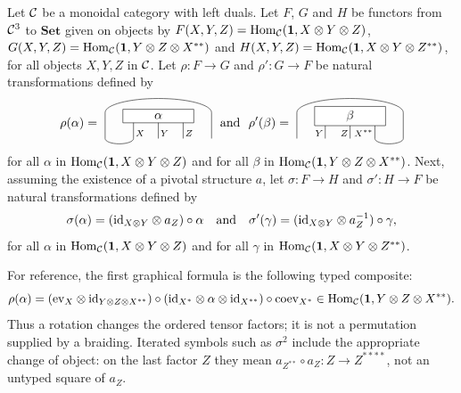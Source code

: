 \documentclass{amsart}
\begin{document}
\begin{definition} \label{def:3Rot}
Let $\mathcal{C}$ be a monoidal category with left duals. Let $F$, $G$ and $H$ be functors from $\mathcal{C}^3$ to $\textbf{Set}$ given on objects by $F(X,Y,Z) = \mathrm{Hom}_{\mathcal{C}}({\bf 1},X \otimes Y \otimes Z)$, $G(X,Y,Z)= \mathrm{Hom}_{\mathcal{C}}({\bf 1}, Y \otimes Z \otimes X^{**})$ and $H(X,Y,Z)= \mathrm{Hom}_{\mathcal{C}}({\bf 1},X \otimes Y \otimes Z^{**})$, for all objects $X,Y,Z$ in $\mathcal{C}$. Let $\rho: F \to G$ and $\rho': G \to F$  be natural transformations defined by
$$\rho(\alpha)=
\raisebox{-.5cm}{
\begin{tikzpicture}
\draw (-0.1,0) -- ++(0,-.64) node[pos=.76,right, font=\scriptsize, inner sep=1.5pt]{$X$} arc (0:-180:.4 and .15) --++(0,.74) arc (180:0:1.5 and .4) --++(0,-.74);
\draw (0+0.6,0)--++(0,-.64) node[pos=.76,right, font=\scriptsize, inner sep=1.5pt]{$Y$} ;
\draw (.7+0.6,0)--++(0,-.64) node[pos=.76,right, font=\scriptsize, inner sep=1.5pt]{$Z$} ;
\draw (0.6,0) node [draw,fill=white,minimum width=2cm] {$\alpha$};
\end{tikzpicture}}
\ \ \text{and}  \ \
\rho'(\beta)=
\raisebox{-.5cm}{
\begin{tikzpicture}
\draw (-.7+0.6,0)--++(0,-.64) node[pos=.76,left, font=\scriptsize, inner sep=1.5pt]{$Y$} ;
\draw (0+0.6,0)--++(0,-.64) node[pos=.76,left, font=\scriptsize, inner sep=1.5pt]{$Z$} ;
\draw (.7+0.6,0)--++(0,-.64) node[pos=.76,left, font=\scriptsize, inner sep=1.5pt]{$X^{**}$}  arc (-180:0:.4 and .15) --++(0,.74) arc (0:180:1.5 and .4) --++(0,-.74);
\draw (0.6,0) node [draw,fill=white,minimum width=2cm] {$\beta$};
\end{tikzpicture}}
$$
for all $\alpha$ in $\mathrm{Hom}_{\mathcal{C}}({\bf 1},X \otimes Y \otimes Z)$ and for all  $\beta$ in $\mathrm{Hom}_{\mathcal{C}}({\bf 1}, Y \otimes Z \otimes X^{**})$. Next, assuming the existence of a pivotal structure $a$, let $\sigma: F \to H$ and $\sigma': H \to F$  be natural transformations defined by $$\sigma(\alpha) = (\mathrm{id}_{X \otimes Y} \otimes a_Z) \circ \alpha \ \ \text{ and } \ \ \sigma'(\gamma) = (\mathrm{id}_{X \otimes Y} \otimes a^{-1}_Z) \circ \gamma,$$ for all $\alpha$ in $\mathrm{Hom}_{\mathcal{C}}({\bf 1},X \otimes Y \otimes Z)$ and for all  $\gamma$ in $\mathrm{Hom}_{\mathcal{C}}({\bf 1},X \otimes Y \otimes Z^{**})$.
\end{definition}

For reference, the first graphical formula is the following typed composite:
\begin{equation}\label{eq:rho-algebraic}
\rho(\alpha)=
 (\mathrm{ev}_X\otimes\mathrm{id}_{Y\otimes Z\otimes X^{**}})
 \circ(\mathrm{id}_{X^*}\otimes\alpha\otimes\mathrm{id}_{X^{**}})
 \circ\mathrm{coev}_{X^*}
 \in\mathrm{Hom}_{\mathcal{C}}({\bf 1},Y\otimes Z\otimes X^{**}).
\end{equation}
Thus a rotation changes the ordered tensor factors; it is not a permutation supplied by a braiding. Iterated symbols such as $\sigma^2$ include the appropriate change of object: on the last factor $Z$ they mean $a_{Z^{**}}\circ a_Z:Z\to Z^{****}$, not an untyped square of $a_Z$.
\end{document}
